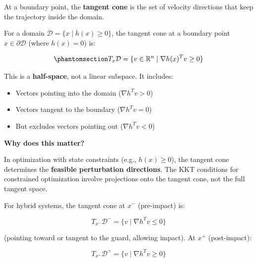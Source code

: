 \documentclass[
  letterpaper,
  DIV=11,
  numbers=noendperiod]{scrartcl}
\providecommand{\tightlist}{%
  \setlength{\itemsep}{0pt}\setlength{\parskip}{0pt}}\usepackage{longtable,booktabs,array}
\begin{document}
At a boundary point, the \textbf{tangent cone} is the set of velocity
directions that keep the trajectory inside the domain.

\begin{tcolorbox}[enhanced jigsaw, coltitle=black, titlerule=0mm, toprule=.15mm, opacitybacktitle=0.6, left=2mm, opacityback=0, rightrule=.15mm, leftrule=.75mm, breakable, colframe=quarto-callout-note-color-frame, bottomtitle=1mm, toptitle=1mm, arc=.35mm, title=\textcolor{quarto-callout-note-color}{\faInfo}\hspace{0.5em}{Tangent Cone}, bottomrule=.15mm, colback=white, colbacktitle=quarto-callout-note-color!10!white]

For a domain \(\mathcal{D} = \{x \mid h(x) \geq 0\}\), the tangent cone
at a boundary point \(x \in \partial \mathcal{D}\) (where \(h(x) = 0\))
is:

\begin{equation}\phantomsection\label{eq-tangent-cone}{
T_x \mathcal{D} = \{v \in \mathbb{R}^n \mid \nabla h(x)^T v \geq 0\}
}\end{equation}

This is a \textbf{half-space}, not a linear subspace. It includes:

\begin{itemize}
\tightlist
\item
  Vectors pointing into the domain (\(\nabla h^T v > 0\))
\item
  Vectors tangent to the boundary (\(\nabla h^T v = 0\))
\item
  But excludes vectors pointing out (\(\nabla h^T v < 0\))
\end{itemize}

\end{tcolorbox}

\textbf{Why does this matter?}

In optimization with state constraints (e.g., \(h(x) \geq 0\)), the
tangent cone determines the \textbf{feasible perturbation directions}.
The KKT conditions for constrained optimization involve projections onto
the tangent cone, not the full tangent space.

For hybrid systems, the tangent cone at \(x^-\) (pre-impact) is:

\[
T_{x^-} \mathcal{D}^- = \{v \mid \nabla h^T v \leq 0\}
\]

(pointing toward or tangent to the guard, allowing impact). At \(x^+\)
(post-impact):

\[
T_{x^+} \mathcal{D}^+ = \{v \mid \nabla h^T v \geq 0\}
\]
\end{document}

